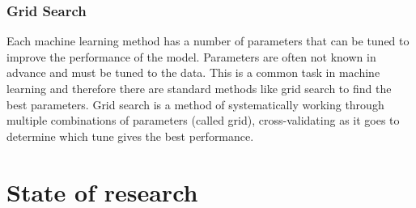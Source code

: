 \subsubsection{Grid Search}
Each machine learning method has a number of parameters that can be tuned to improve the
performance of the model. Parameters are often not known in advance and must be tuned to the data.
This is a common task in machine learning and therefore there are standard methods like grid
search to find the best parameters.
Grid search is a method of systematically working through multiple combinations of parameters
(called grid), cross-validating as it goes to determine which tune gives the best performance.
\cite[p. 260-275]{muller_introductionmachinelearning_2016}


\section{State of research}





